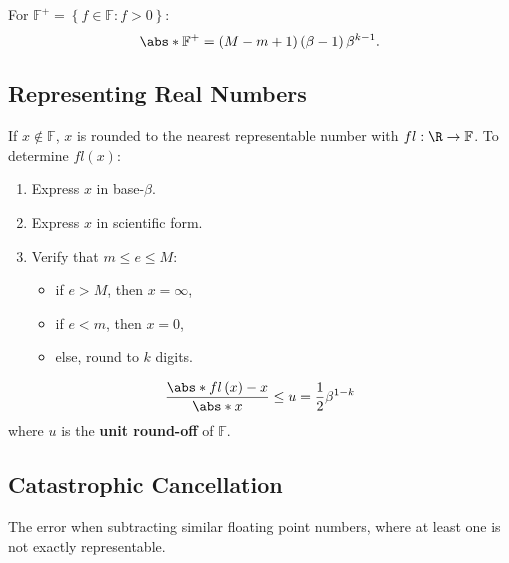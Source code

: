 \documentclass{article}
\begin{document}
\begin{multicols}{3}
    For \(\mathbb{F}^+ = \left\{ f \in \mathbb{F} : f > 0 \right\}\):
    \begin{equation*}
        \abs*{\mathbb{F}^+} = \left( M - m + 1 \right) \left( \beta - 1 \right) \beta^{k - 1}.
    \end{equation*}
    \subsection{Representing Real Numbers}
    If \(x \notin \mathbb{F}\), \(x\) is rounded to the nearest representable number
    with \(fl : \R \to \mathbb{F}\). To determine \(fl\left( x \right)\):
    \begin{enumerate}
        \item Express \(x\) in base-\(\beta\).
        \item Express \(x\) in scientific form.
        \item Verify that \(m \leq e \leq M\):
              \begin{itemize}
                  \item if \(e > M\), then \(x = \infty\),
                  \item if \(e < m\), then \(x = 0\),
                  \item else, round to \(k\) digits.
              \end{itemize}
    \end{enumerate}
    \begin{equation*}
        \frac{\abs*{fl\left( x \right) - x}}{\abs*{x}} \leq u = \frac{1}{2} \beta^{1 - k}
    \end{equation*}
    where \(u\) is the \textbf{unit round-off} of \(\mathbb{F}\).
    \subsection{Catastrophic Cancellation}
    The error when subtracting similar floating
    point numbers, where at least one is not exactly representable.

\end{multicols}
\end{document}
